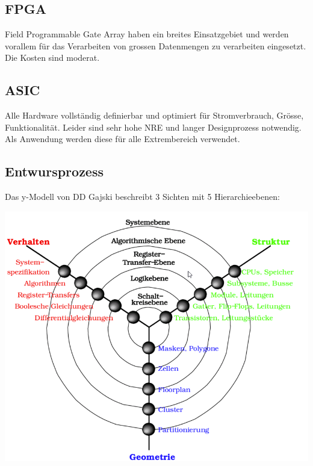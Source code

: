 \subsection{FPGA}
Field Programmable Gate Array haben ein breites Einsatzgebiet und werden vorallem für das Verarbeiten von grossen Datenmengen zu verarbeiten eingesetzt. Die Kosten sind moderat.

\subsection{ASIC}
Alle Hardware vollständig definierbar und optimiert für Stromverbrauch, Grösse, Funktionalität. Leider sind sehr hohe NRE und langer Designprozess notwendig. Als Anwendung werden diese für alle Extrembereich verwendet.

\subsection{Entwursprozess}
Das y-Modell von DD Gajski beschreibt 3 Sichten mit 5 Hierarchieebenen:
\begin{center}
	\includegraphics[width=\columnwidth]{Images/y-modell}
\end{center}
 
